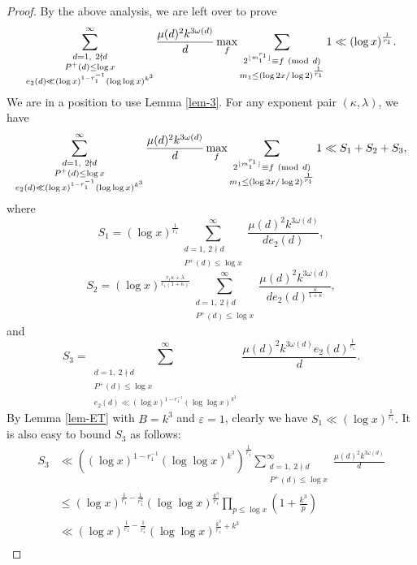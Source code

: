 \documentclass[12pt,a4paper,reqno]{amsart}
\numberwithin{equation}{section}
\def\pmod #1{\ ({\rm{mod}}\ #1)}
\theoremstyle{plain}
\theoremstyle{definition}
\begin{document}
\begin{proof}
By the above analysis, we are left over to prove
\begin{align}\label{eq-lem-4-3}
\sum_{\substack{d=1,\ 2\nmid d \\P^+(d)\le \log x\\ e_2(d)\ll (\log x)^{1-r_1^{-1}}(\log\log x)^{k^3}}}^{\infty}\frac{\mu(d)^2 k^{3\omega(d)}}{d}\max_{f}\sum_{\substack{2^{ \lfloor m_1^{r_1}\rfloor}\equiv f\pmod{d}\\ m_1\le (\log 2x/\log 2)^{\frac{1}{r_1}}}}1\ll 
(\log x)^{\frac{1}{r_1}}.
\end{align}
We are in a position to use Lemma \ref{lem-3}. For any exponent pair $(\kappa, \lambda)$, we have
\begin{align*}
\sum_{\substack{d=1,\ 2\nmid d \\P^+(d)\le \log x\\ e_2(d)\ll (\log x)^{1-r_1^{-1}}(\log\log x)^{k^3}}}^{\infty}\frac{\mu(d)^2 k^{3\omega(d)}}{d}\max_{f}\sum_{\substack{2^{ \lfloor m_1^{r_1}\rfloor}\equiv f\pmod{d}\\ m_1\le (\log 2x/\log 2)^{\frac{1}{r_1}}}}1\ll S_1+S_2+S_3,
\end{align*}
where
$$
S_1=(\log x)^{\frac{1}{r_1}}\sum_{\substack{d=1,\ 2\nmid d \\P^+(d)\le \log x}}^{\infty}\frac{\mu(d)^2 k^{3\omega(d)}}{de_2(d)},
$$
$$
S_2=(\log x)^{\frac{r_1\kappa+\lambda}{r_1(1+\kappa)}}\sum_{\substack{d=1,\ 2\nmid d \\P^+(d)\le \log x}}^{\infty}\frac{\mu(d)^2 k^{3\omega(d)}}{de_2(d)^{\frac{\kappa}{1+\kappa}}},
$$
and
$$
S_3=\sum_{\substack{d=1,\ 2\nmid d \\P^+(d)\le \log x\\ e_2(d)\ll (\log x)^{1-r_1^{-1}}(\log\log x)^{k^3}}}^{\infty}\frac{\mu(d)^2 k^{3\omega(d)}e_2(d)^{\frac{1}{r_1}}}{d}.
$$
By Lemma \ref{lem-ET} with $B=k^3$ and $\varepsilon=1$, clearly we have
$
S_1\ll (\log x)^{\frac{1}{r_1}}.
$
It is also easy to bound $S_3$ as follows:
\begin{align*}
S_3&\ll \left((\log x)^{1-r_1^{-1}}(\log\log x)^{k^3}\right)^{\frac{1}{r_1}}\sum_{\substack{d=1,\ 2\nmid d \\P^+(d)\le \log x}}^{\infty}\frac{\mu(d)^2 k^{3\omega(d)}}{d}\\
&\le (\log x)^{\frac{1}{r_1}-\frac{1}{r_1^2}}(\log\log x)^{\frac{k^3}{r_1}}\prod_{p\le \log x}\left(1+\frac{k^3}{p}\right)\\
&\ll (\log x)^{\frac{1}{r_1}-\frac{1}{r_1^2}}(\log\log x)^{\frac{k^3}{r_1}+k^3}\\

\end{align*}
\end{proof}
\end{document}
